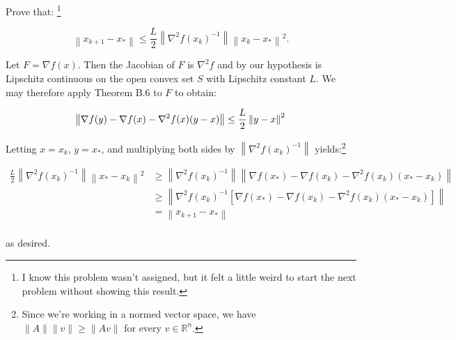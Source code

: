 Prove that: \footnote{
    I know this problem wasn't assigned, but it felt a little weird to start the next problem without showing this 
    result.
}

$$
\left\lVert x_{k+1} - x_* \right\rVert \le \frac{L}{2} \left\lVert \nabla^2 f(x_k)^{-1} \right\rVert \left\lVert x_k - x_* \right\rVert^2.
$$

\begin{solution}
    Let $F = \nabla f(x)$. Then the Jacobian of $F$ is $\nabla^2 f$ and by our hypothesis is Lipschitz continuous on the
    open convex set $S$ with Lipschitz constant $L$. We may therefore apply Theorem B.6 to $F$ to obtain:

    $$
        \left\lVert \nabla f(y) - \nabla f(x) - \nabla^2 f(x) (y - x) \right\rVert \le \frac{L}{2} \left\lVert y - x \right\rVert^2 \\
    $$

    Letting $x = x_k$, $y = x_*$, and multiplying both sides by $\left\lVert \nabla^2 f(x_k)^{-1} \right\rVert$ yields:\footnote{
        Since we're working in a normed vector space, we have $\lVert A \rVert \lVert v \rVert \ge \lVert A v \rVert$ 
        for every $v \in \mathbb{R}^n$.
    }

    \begin{align*}
        \frac{L}{2} \left\lVert \nabla^2 f(x_k)^{-1} \right\rVert \left\lVert x_* - x_k \right\rVert^2 &\ge \left\lVert \nabla^2 f(x_k)^{-1} \right\rVert \left\lVert \nabla f(x_*) - \nabla f(x_k) - \nabla^2 f(x_k) (x_* - x_k) \right\rVert \\
                                                                                                       &\ge \left\lVert \nabla^2 f(x_k)^{-1} \left[ \nabla f(x_*) - \nabla f(x_k) - \nabla^2 f(x_k) (x_* - x_k) \right] \right\rVert \\
                                                                                                       &= \left\lVert x_{k+1} - x_* \right\rVert \\
    \end{align*}

    as desired.
    \ \\
\end{solution}
